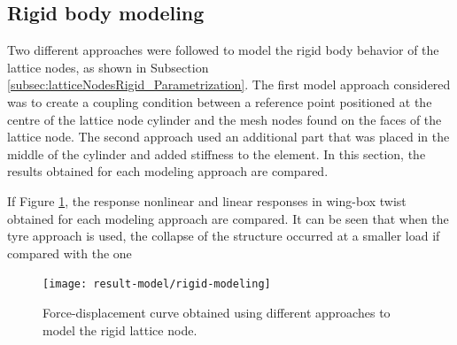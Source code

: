   \subsection{Rigid body modeling} \label{subsec:rigidBody_results_model}
    
    Two different approaches were followed to model the rigid body behavior of the lattice nodes, as shown in Subsection \ref{subsec:latticeNodesRigid_Parametrization}. The first model approach considered was to create a coupling condition between a reference point positioned at the centre of the lattice node cylinder and the mesh nodes found on the faces of the lattice node. The second approach used an additional part that was placed in the middle of the cylinder and added stiffness to the element. In this section, the results obtained for each modeling approach are compared.

    If Figure \ref{fig:rigid-modeling}, the response nonlinear and linear responses in wing-box twist obtained for each modeling approach are compared. It can be seen that when the tyre approach is used, the collapse of the structure occurred at a smaller load if compared with the one 

    \begin{figure}[!htpb]
      \centering
      \texttt{[image: result-model/rigid-modeling]}
      \caption[Force-displacement curve obtained using different approaches to model the rigid lattice node]{Force-displacement curve obtained using different approaches to model the rigid lattice node. }\label{fig:rigid-modeling}
    \end{figure}

